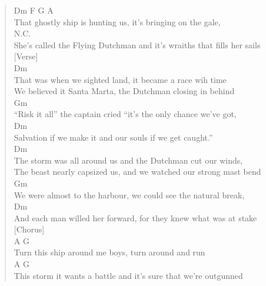 \documentclass[11pt]{article}
\begin{document}
\begin{verse}
\vspace*{1em}
Dm                    F                G               A\\
That ghostly ship is hunting us, it's bringing on the gale,\\
\vspace*{1em}
N.C.\\
She's called the Flying Dutchman and it's wraiths that fills her sails\\
\vspace*{1em}
[Verse]\\
Dm\\
That was when we sighted land, it became a race wih time\\
\vspace*{1em}
We believed it Santa Marta, the Dutchman closing in behind\\
\vspace*{1em}
Gm\\
``Risk it all'' the captain cried ``it's the only chance we've got,\\
\vspace*{1em}
Dm\\
Salvation if we make it and our souls if we get caught.''\\
\vspace*{1em}
Dm\\
The storm was all around us and the Dutchman cut our winds,\\
\vspace*{1em}
The beast nearly capsized us, and we watched our strong mast bend\\
\vspace*{1em}
Gm\\
We were almost to the harbour, we could see the natural break,\\
\vspace*{1em}
Dm\\
And each man willed her forward, for they knew what was at stake\\
\vspace*{1em}
[Chorus]\\
A                              G\\
Turn this ship around me boys, turn around and run\\
\vspace*{1em}
A                                     G\\
This storm it wants a battle and it's sure that we're outgunned\\
\vspace*{1em}

\end{verse}
\end{document}
